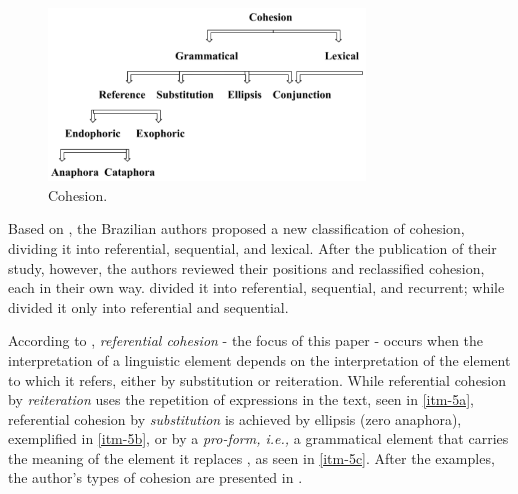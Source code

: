 \documentclass{textolivre}
\begin{document}
%
% 
\begin{figure}[htbp]
 \centering
 \includegraphics[width=0.75\textwidth]{fig01.png}
 \caption{Cohesion.}
 \label{fig01}
\end{figure}



Based on \textcite{halliday_cohesion_1976}, the Brazilian authors \textcite{favero_criterios_1985}
proposed a new classification of cohesion, dividing it into
referential, sequential, and lexical. After the publication of their
study, however, the authors reviewed their positions and reclassified
cohesion, each in their own way. \textcite{favero_coesao_2010} divided it into
referential, sequential, and recurrent; while \textcite{koch_coesao_2010} divided it
only into referential and sequential.

According to \textcite[p.~18-25]{favero_coesao_2010}, \emph{referential cohesion} - the
focus of this paper - occurs when the interpretation of a linguistic
element depends on the interpretation of the element to which it refers,
either by substitution or reiteration. While referential cohesion by
\emph{reiteration} uses the repetition of expressions in the text, seen
in \ref{itm-5a}, referential cohesion by \emph{substitution} is achieved by
ellipsis (zero anaphora), exemplified in \ref{itm-5b}, or by a \emph{pro-form,
i.e.,} a grammatical element that carries the meaning of the element it
replaces \cite[p.~19]{favero_coesao_2010}, as seen in \ref{itm-5c}. After the examples, the
author's types of cohesion are presented in .
\end{document}
